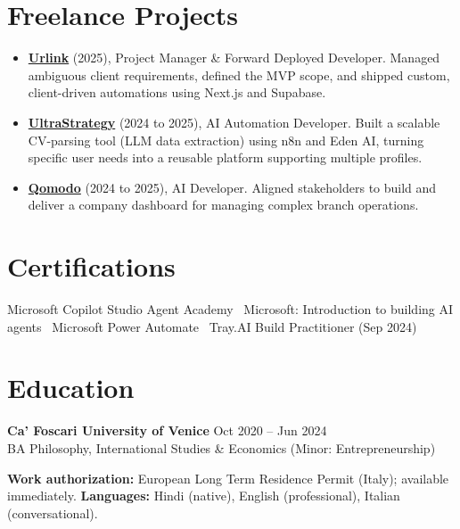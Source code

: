 \documentclass[a4paper,10pt]{article}
\begin{document}
\section{Freelance Projects}
\begin{itemize}
 \item \textbf{\href{https://smarturlink.com/}{Urlink}} (2025), Project Manager \& Forward Deployed Developer. Managed ambiguous client requirements, defined the MVP scope, and shipped custom, client-driven automations using Next.js and Supabase.
 \item \textbf{\href{https://ultrastrategy.com}{UltraStrategy}} (2024 to 2025), AI Automation Developer. Built a scalable CV-parsing tool (LLM data extraction) using n8n and Eden AI, turning specific user needs into a reusable platform supporting multiple profiles.
 \item \textbf{\href{https://www.qomodo.me/}{Qomodo}} (2024 to 2025), AI Developer. Aligned stakeholders to build and deliver a company dashboard for managing complex branch operations.
\end{itemize}

\section{Certifications}
Microsoft Copilot Studio Agent Academy \textbullet\ Microsoft: Introduction to building AI agents \textbullet\ Microsoft Power Automate \textbullet\ Tray.AI Build Practitioner (Sep 2024)

\section{Education}
\textbf{Ca' Foscari University of Venice} \hfill Oct 2020 -- Jun 2024\\
BA Philosophy, International Studies \& Economics (Minor: Entrepreneurship)

\vspace{2pt}
{\small \textbf{Work authorization:} European Long Term Residence Permit (Italy); available immediately. \quad \textbf{Languages:} Hindi (native), English (professional), Italian (conversational).}
\end{document}
